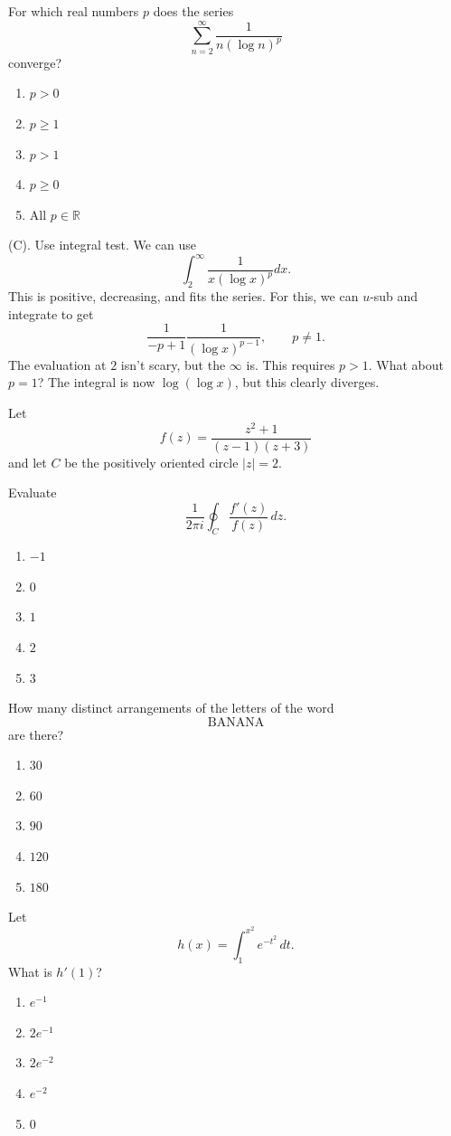 \begin{exercise}
For which real numbers $p$ does the series
\[
\sum_{n=2}^{\infty}
\frac{1}{n(\log n)^p}
\]
converge?
\begin{enumerate}[label=(\Alph*)]
\item $p>0$
\item $p\geq1$
\item $p>1$
\item $p\geq0$
\item All $p\in\mathbb R$
\end{enumerate}
\end{exercise}
\begin{solution}
(C). Use integral test. We can use 
\[
\int_2^{\infty} \frac{1}{x(\log x)^p} dx.
\]
This is positive, decreasing, and fits the series.
For this, we can $u$-sub and integrate to get
\[
\frac{1}{-p+1}\frac{1}{(\log x)^{p - 1}}, \qquad p \neq 1.
\]
The evaluation at $2$ isn't scary, but the $\infty$ is. This requires 
$p > 1$. What about $p = 1$? The integral is now $\log (\log x)$, but this clearly diverges.
\end{solution}

\begin{exercise}
Let
\[
f(z)=\frac{z^2+1}{(z-1)(z+3)}
\]
and let $C$ be the positively oriented
circle $|z|=2$.

Evaluate
\[
\frac{1}{2\pi i}
\oint_C\frac{f'(z)}{f(z)}\,dz.
\]
\begin{enumerate}[label=(\Alph*)]
\item $-1$
\item $0$
\item $1$
\item $2$
\item $3$
\end{enumerate}
\end{exercise}

\begin{exercise}
How many distinct arrangements of the
letters of the word
\[
\text{BANANA}
\]
are there?
\begin{enumerate}[label=(\Alph*)]
\item $30$
\item $60$
\item $90$
\item $120$
\item $180$
\end{enumerate}
\end{exercise}

\begin{exercise}
Let
\[
h(x)=\int_1^{x^2}e^{-t^2}\,dt.
\]
What is $h'(1)$?
\begin{enumerate}[label=(\Alph*)]
\item $e^{-1}$
\item $2e^{-1}$
\item $2e^{-2}$
\item $e^{-2}$
\item $0$
\end{enumerate}
\end{exercise}

